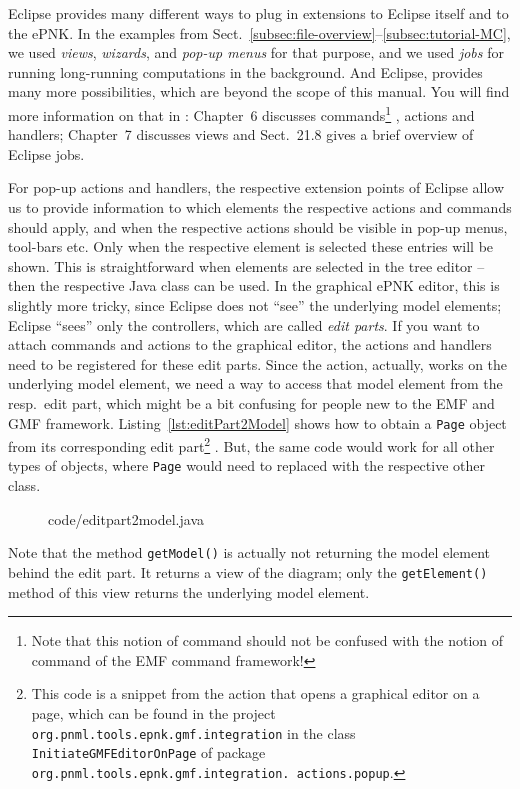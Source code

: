 Eclipse provides many different ways to plug in extensions to Eclipse itself and to
the ePNK. In the examples from Sect.~\ref{subsec:file-overview}--\ref{subsec:tutorial-MC},
we used \emph{views}, \emph{wizards}, and \emph{pop-up menus} for that purpose, and
we used \emph{jobs} for running long-running computations in the background. And Eclipse,
provides many more possibilities, which are beyond the scope of this manual. You will
find more information on that in \cite{ClRu08}: Chapter~6 discusses commands\footnote
  {Note that this notion of command should not be confused with the notion
   of command of the EMF command framework!}%
, actions and handlers; Chapter~7 discusses views and Sect.~21.8 gives a brief
overview of Eclipse jobs.

For pop-up actions and handlers, the respective extension points of Eclipse allow us
to provide information to which elements the respective actions and commands should apply,
and when the respective actions should be visible in pop-up menus, tool-bars etc. Only when
the respective element is selected these entries will be shown. This is straightforward
when elements are selected in the tree editor -- then the respective Java class
can be used. In the graphical ePNK editor, this is slightly more tricky, since
Eclipse does not ``see'' the underlying model elements; Eclipse ``sees'' only the
controllers, which are called \emph{edit parts}.%
If you want to attach commands and actions to the graphical editor, the actions
and handlers need to be registered for these edit parts. Since the action,
actually, works on the underlying model element, we need a way to access
that model element from the resp.\ edit part, which might be a bit confusing for
people new to the EMF and GMF framework.
%
Listing~\ref{lst:editPart2Model} shows how to obtain a {\tt Page} object from its
corresponding edit part\footnote
  {This code is a snippet from the action that opens a graphical editor on a page,
   which can be found in the project {\tt org.pnml.tools.epnk.gmf.integration}
   in the class {\tt InitiateGMFEditorOnPage} of package
   {\tt org.pnml.tools.epnk.gmf.integration. actions.popup}.}%
. But, the same code would work for all other types of objects,
where {\tt Page} would need to replaced with the respective other class.
%
\begin{figure}[htbp!]
%
  {code/editpart2model.java}
\end{figure}
%
Note that the method {\tt getModel()} is actually not returning the
model element behind the edit part. It returns a view of the diagram; only
the {\tt getElement()} method of this view returns the underlying model
element.


